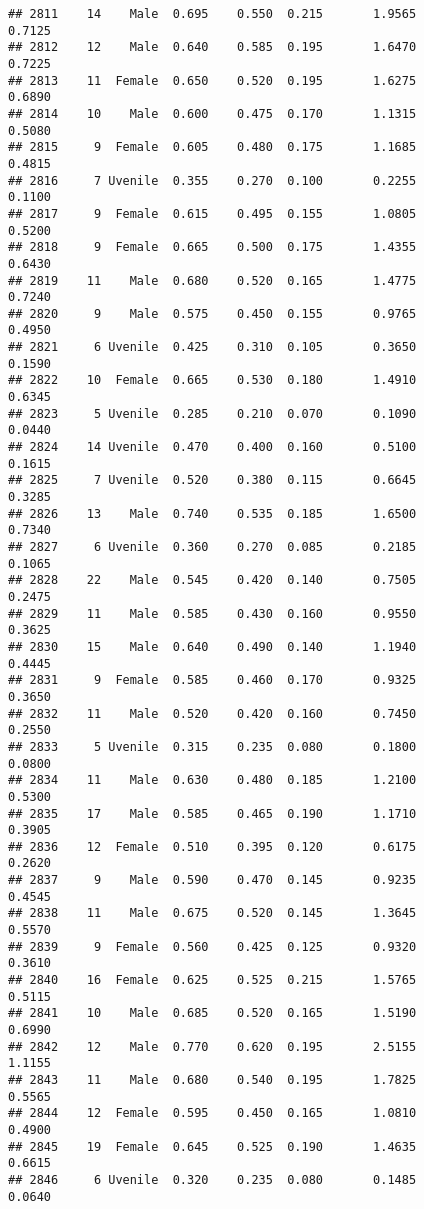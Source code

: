 \documentclass[
]{article}
\begin{document}
\begin{verbatim}
## 2811    14    Male  0.695    0.550  0.215       1.9565         0.7125
## 2812    12    Male  0.640    0.585  0.195       1.6470         0.7225
## 2813    11  Female  0.650    0.520  0.195       1.6275         0.6890
## 2814    10    Male  0.600    0.475  0.170       1.1315         0.5080
## 2815     9  Female  0.605    0.480  0.175       1.1685         0.4815
## 2816     7 Uvenile  0.355    0.270  0.100       0.2255         0.1100
## 2817     9  Female  0.615    0.495  0.155       1.0805         0.5200
## 2818     9  Female  0.665    0.500  0.175       1.4355         0.6430
## 2819    11    Male  0.680    0.520  0.165       1.4775         0.7240
## 2820     9    Male  0.575    0.450  0.155       0.9765         0.4950
## 2821     6 Uvenile  0.425    0.310  0.105       0.3650         0.1590
## 2822    10  Female  0.665    0.530  0.180       1.4910         0.6345
## 2823     5 Uvenile  0.285    0.210  0.070       0.1090         0.0440
## 2824    14 Uvenile  0.470    0.400  0.160       0.5100         0.1615
## 2825     7 Uvenile  0.520    0.380  0.115       0.6645         0.3285
## 2826    13    Male  0.740    0.535  0.185       1.6500         0.7340
## 2827     6 Uvenile  0.360    0.270  0.085       0.2185         0.1065
## 2828    22    Male  0.545    0.420  0.140       0.7505         0.2475
## 2829    11    Male  0.585    0.430  0.160       0.9550         0.3625
## 2830    15    Male  0.640    0.490  0.140       1.1940         0.4445
## 2831     9  Female  0.585    0.460  0.170       0.9325         0.3650
## 2832    11    Male  0.520    0.420  0.160       0.7450         0.2550
## 2833     5 Uvenile  0.315    0.235  0.080       0.1800         0.0800
## 2834    11    Male  0.630    0.480  0.185       1.2100         0.5300
## 2835    17    Male  0.585    0.465  0.190       1.1710         0.3905
## 2836    12  Female  0.510    0.395  0.120       0.6175         0.2620
## 2837     9    Male  0.590    0.470  0.145       0.9235         0.4545
## 2838    11    Male  0.675    0.520  0.145       1.3645         0.5570
## 2839     9  Female  0.560    0.425  0.125       0.9320         0.3610
## 2840    16  Female  0.625    0.525  0.215       1.5765         0.5115
## 2841    10    Male  0.685    0.520  0.165       1.5190         0.6990
## 2842    12    Male  0.770    0.620  0.195       2.5155         1.1155
## 2843    11    Male  0.680    0.540  0.195       1.7825         0.5565
## 2844    12  Female  0.595    0.450  0.165       1.0810         0.4900
## 2845    19  Female  0.645    0.525  0.190       1.4635         0.6615
## 2846     6 Uvenile  0.320    0.235  0.080       0.1485         0.0640

\end{verbatim}
\end{document}

